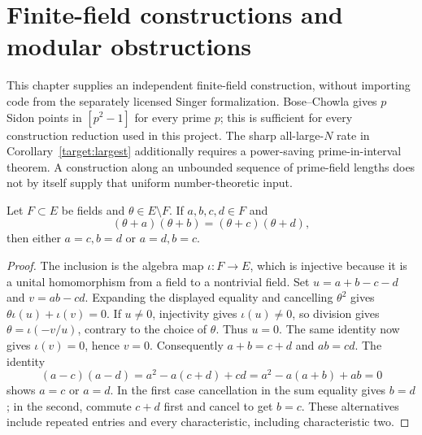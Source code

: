 \chapter{Finite-field constructions and modular obstructions}
\label{construction:chapter}

This chapter supplies an independent finite-field construction, without
importing code from the separately licensed Singer formalization.
Bose--Chowla gives $p$ Sidon points in $[p^2-1]$ for every prime $p$;
this is sufficient for every construction reduction used in this project.
The sharp all-large-$N$ rate in Corollary~\ref{target:largest} additionally
requires a power-saving prime-in-interval theorem.  A construction along
an unbounded sequence of prime-field lengths does not by itself supply
that uniform number-theoretic input.

\begin{lemma}
\label{construction:shifted-products}
\leanok
Let $F\subset E$ be fields and $\theta\in E\setminus F$.
If $a,b,c,d\in F$ and
\[
 (\theta+a)(\theta+b)=(\theta+c)(\theta+d),
\]
then either $a=c,b=d$ or $a=d,b=c$.
\end{lemma}
\begin{proof}
The inclusion is the algebra map $\iota:F\to E$, which is injective
because it is a unital homomorphism from a field to a nontrivial field.
Set $u=a+b-c-d$ and $v=ab-cd$.  Expanding the displayed equality and
cancelling $\theta^2$ gives
$\theta\iota(u)+\iota(v)=0$.
If $u\ne0$, injectivity gives $\iota(u)\ne0$, so division gives
$\theta=\iota(-v/u)$, contrary to the choice of $\theta$.
Thus $u=0$.  The same identity now gives $\iota(v)=0$, hence $v=0$.
Consequently $a+b=c+d$ and $ab=cd$.
The identity
\[
 (a-c)(a-d)=a^2-a(c+d)+cd=a^2-a(a+b)+ab=0
\]
shows $a=c$ or $a=d$.  In the first case cancellation in the sum equality
gives $b=d$; in the second, commute $c+d$ first and cancel to get $b=c$.
These alternatives include repeated entries and every characteristic,
including characteristic two.
\end{proof}

